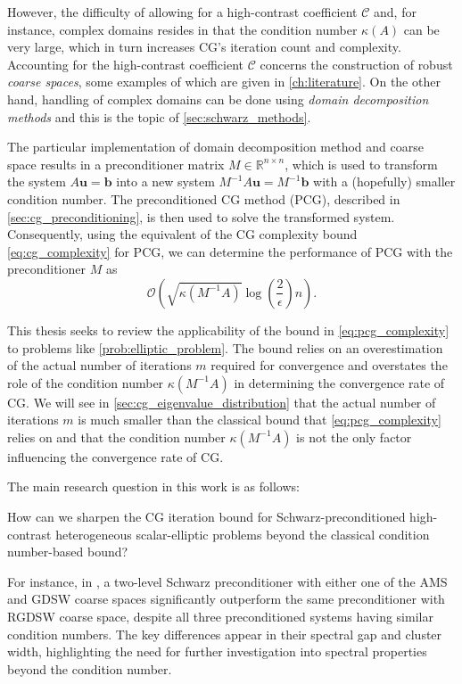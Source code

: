 However, the difficulty of allowing for a high-contrast coefficient $\mathcal{C}$ and, for instance, complex domains resides in that the condition number $\kappa(A)$ can be very large, which in turn increases CG's iteration count and complexity. Accounting for the high-contrast coefficient $\mathcal{C}$ concerns the construction of robust \textit{coarse spaces}, some examples of which are given in \cref{ch:literature}. On the other hand, handling of complex domains can be done using \textit{domain decomposition methods} and this is the topic of \cref{sec:schwarz_methods}. 

The particular implementation of domain decomposition method and coarse space results in a preconditioner matrix $M\in\mathbb{R}^{n \times n}$, which is used to transform the system $A\mathbf{u} = \mathbf{b}$ into a new system $M^{-1}A\mathbf{u} = M^{-1}\mathbf{b}$ with a (hopefully) smaller condition number. The preconditioned CG method (PCG), described in \cref{sec:cg_preconditioning}, is then used to solve the transformed system. Consequently, using the equivalent of the CG complexity bound \cref{eq:cg_complexity} for PCG, we can determine the performance of PCG with the preconditioner $M$ as
\begin{equation}
  \mathcal{O}\left(\sqrt{\kappa(M^{-1}A)}\log\left(\frac{2}{\epsilon}\right)n\right).
  \label{eq:pcg_complexity}
\end{equation}

This thesis seeks to review the applicability of the bound in \cref{eq:pcg_complexity} to problems like \cref{prob:elliptic_problem}. The bound relies on an overestimation of the actual number of iterations $m$ required for convergence and overstates the role of the condition number $\kappa(M^{-1}A)$ in determining the convergence rate of CG. We will see in \cref{sec:cg_eigenvalue_distribution} that the actual number of iterations $m$ is much smaller than the classical bound that \cref{eq:pcg_complexity} relies on and that the condition number $\kappa(M^{-1}A)$ is not the only factor influencing the convergence rate of CG. 

The main research question in this work is as follows:
\begin{researchq} \label{rq:main}
    \par
    How can we sharpen the CG iteration bound for Schwarz-preconditioned high-contrast heterogeneous scalar-elliptic problems beyond the classical condition number-based bound?
\end{researchq}
For instance, in \cite{ams_coarse_space_comp_study_Alves2024}, a two-level Schwarz preconditioner with either one of the AMS and GDSW coarse spaces significantly outperform the same preconditioner with RGDSW coarse space, despite all three preconditioned systems having similar condition numbers. The key differences appear in their spectral gap and cluster width, highlighting the need for further investigation into spectral properties beyond the condition number.

